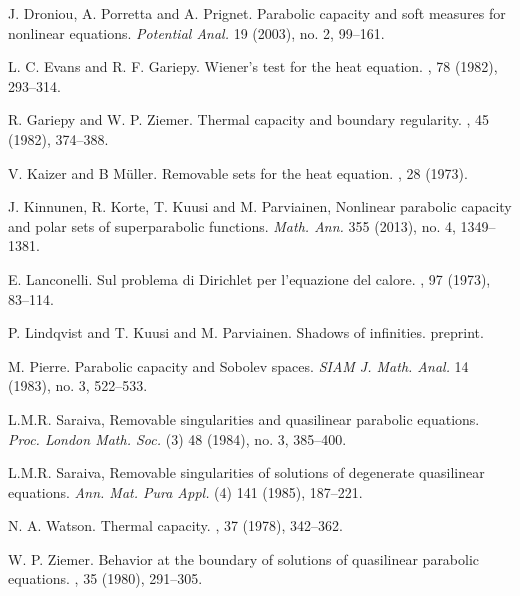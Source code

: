 \documentclass[reqno,a4paper,12pt]{amsart}
\theoremstyle{definition}
\numberwithin{theorem}{section} \numberwithin{equation}{section}
\begin{document}
\begin{thebibliography}{KKKP}
	 J. Droniou, A. Porretta and A. Prignet. 
	\newblock Parabolic capacity and soft measures for nonlinear equations. 
	\newblock \emph{Potential Anal.} 19 (2003), no. 2, 99--161.
	
	 L. C. Evans and R. F. Gariepy. 
	\newblock Wiener's test for the heat equation. 
	, 78 (1982), 293--314.
	
	 R. Gariepy and W. P. Ziemer. 
	\newblock Thermal capacity and boundary regularity. 
	, 45 (1982), 374--388.
	
	 V. Kaizer and B Müller.
	\newblock Removable sets for the heat equation. 
	, 28 (1973).
	
	 J. Kinnunen, R. Korte, T. Kuusi and M. Parviainen, 
	\newblock Nonlinear parabolic capacity and polar sets of superparabolic functions.
	\newblock \emph{Math. Ann.} 355 (2013), no. 4, 1349--1381.
	
	 E. Lanconelli. 
	\newblock Sul problema di Dirichlet per l'equazione del calore. 
	, 97 (1973), 83--114.
	
	 P. Lindqvist and T. Kuusi and M. Parviainen.
	\newblock Shadows of infinities. 
	\newblock preprint.
	
	 M. Pierre. 
	\newblock Parabolic capacity and Sobolev spaces. 
	\newblock \emph{SIAM J. Math. Anal.} 14 (1983), no. 3, 522--533.
	
	 L.M.R. Saraiva, 
	\newblock Removable singularities and quasilinear parabolic equations. 
	\newblock \emph{Proc. London Math. Soc.} (3) 48 (1984), no. 3, 385–400.
	
	 L.M.R. Saraiva, 
	\newblock Removable singularities of solutions of degenerate quasilinear equations.
	\newblock \emph{Ann. Mat. Pura Appl.} (4) 141 (1985), 187--221.
	
	 N. A. Watson. 
	\newblock Thermal capacity. 
	, 37 (1978), 342--362.
	
	 W. P. Ziemer. 
	\newblock Behavior at the boundary of solutions of quasilinear parabolic equations.
	, 35 (1980), 291--305.
\end{thebibliography}
\end{document}
